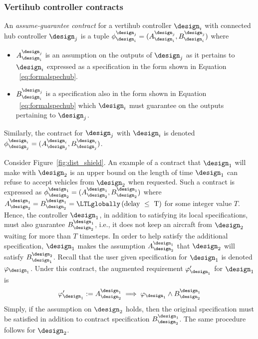  \subsubsection*{\textbf{Vertihub controller contracts}}
 An \emph{assume-guarantee contract} for a vertihub controller $\design_i$ with connected hub controller $\design_j$ is a tuple $\mathcal \phi_{\design_i}^{\design_j} = (A_{\design_i}^{\design_j},B_{\design_i}^{\design_j})$ where
\begin{itemize}
\item $A_{\design_i}^{\design_j}$ is an assumption on the outputs of $\design_j$ as it pertains to ${\design_i}$ expressed as a specification in the form shown in Equation ~\eqref{eq:formalspechub}. 
\item $B_{\design_i}^{\design_j}$ is a specification also in the form shown in Equation ~\eqref{eq:formalspechub}  which $\design_i$ must guarantee on the outputs pertaining to $\design_j$.
\end{itemize}
Similarly, the contract for $\design_j$ with $\design_i$ is denoted $\mathcal \phi_{\design_j}^{\design_i} = (A_{\design_j}^{\design_i},B_{\design_j}^{\design_i})$.


\begin{eg}
Consider Figure~\ref{fig:dist_shield}. An example of a contract that $\design_1$ will make with $\design_2$ is an upper bound on the length of time $\design_1$ can refuse to accept vehicles from $\design_2$ when requested. Such a contract is expressed as $\phi_{\design_2}^{\design_1}= (A_{\design_2}^{\design_1},B_{\design_2}^{\design_1})$ where $A_{\design_2}^{\design_1} = B_{\design_2}^{\design_1} = \LTLglobally \left(\text{delay } \leq \text{ T}\right)$ for some integer value $T$. Hence, the controller $\design_1$, in addition to satisfying its local specifications, must also guarantee $B_{\design_2}^{\design_1}$, i.e., it does not keep an aircraft from $\design_2$ waiting for more than $T$ timesteps. In order to help satisfy the additional specification, $\design_1$ makes the assumption $A_{\design_2}^{\design_1}$ that $\design_2$ will satisfy $B_{\design_1}^{\design_2}$. Recall that the user given specification for $\design_1$ is denoted $\varphi_{\design_1}$. Under this contract, the augmented requirement $\varphi_{\design_1}'$ for $\design_1$ is
$$ \varphi_{\design_1}' := A_{\design_2}^{\design_1} \implies \varphi_{\design_1} \wedge B_{\design_2}^{\design_1} $$
Simply, if the assumption on $\design_2$ holds, then the original specification must be satisfied in addition to contract specification $B_{\design_2}^{\design_1}$. The same procedure follows for $\design_2$. \end{eg}


